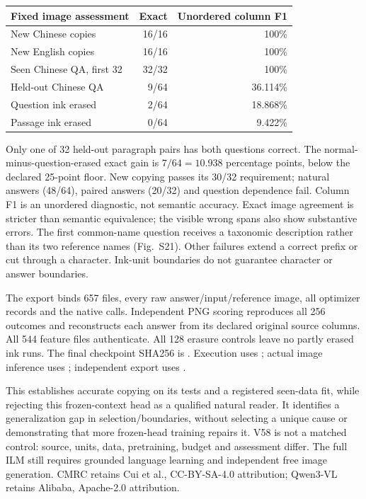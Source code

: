 \begin{center}\small
\begin{tabular}{lrr}
\toprule
Fixed image assessment & Exact & Unordered column F1\\
\midrule
New Chinese copies & 16/16 & 100\%\\
New English copies & 16/16 & 100\%\\
Seen Chinese QA, first 32 & 32/32 & 100\%\\
Held-out Chinese QA & 9/64 & 36.114\%\\
Question ink erased & 2/64 & 18.868\%\\
Passage ink erased & 0/64 & 9.422\%\\
\bottomrule
\end{tabular}
\end{center}
Only one of 32 held-out paragraph pairs has both questions correct. The
normal-minus-question-erased exact gain is $7/64=10.938$ percentage points,
below the declared 25-point floor. New copying passes its 30/32 requirement;
natural answers (48/64), paired answers (20/32) and question dependence fail.
Column F1 is an unordered diagnostic, not semantic accuracy. Exact image
agreement is stricter than semantic equivalence; the visible wrong spans
also show substantive errors. The first common-name question receives a
taxonomic description rather than its two reference names (Fig.~S21).
Other failures extend a correct prefix or cut through a character. Ink-unit
boundaries do not guarantee character or answer boundaries.

The export  binds
657 files, every raw answer/input/reference image, all optimizer records and
the native calls. Independent PNG scoring reproduces all 256 outcomes and
reconstructs each answer from its declared original source columns. All 544
feature files authenticate. All 128 erasure controls leave no partly erased
ink runs. The final checkpoint SHA256 is
.
Execution uses ; actual image
inference uses ; independent
export uses .

This establishes accurate copying on its tests and a registered seen-data
fit, while rejecting this frozen-context head as a qualified natural reader.
It identifies a generalization gap in selection/boundaries, without selecting
a unique cause or demonstrating that more frozen-head training repairs it.
V58 is not a matched control: source, units, data, pretraining, budget and
assessment differ. The full ILM still requires grounded language learning
and independent free image generation. CMRC retains Cui et al.\cite{cmrc},
CC-BY-SA-4.0 attribution; Qwen3-VL retains Alibaba, Apache-2.0 attribution.

